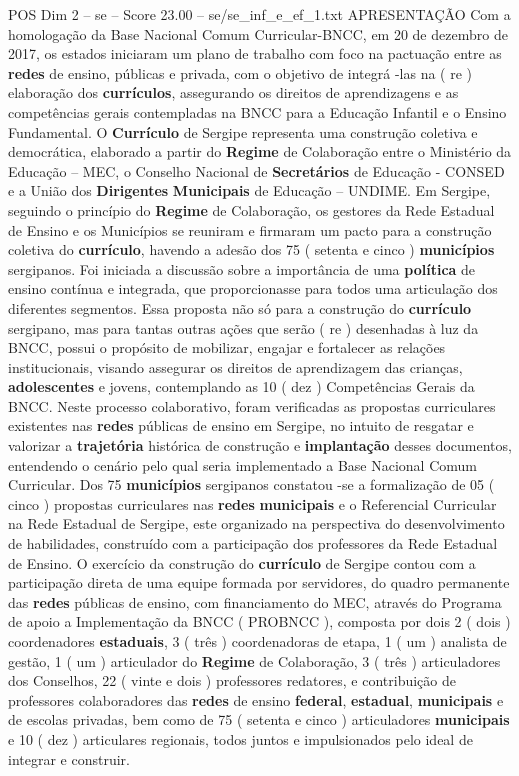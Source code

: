 \begin{textsample}{POS Dim 2 – se – Score 23.00 – se/se\_inf\_e\_ef\_1.txt}  \label{ex:f2_pos_027}
APRESENTAÇÃO Com a homologação da Base Nacional Comum Curricular-BNCC, em 20 de dezembro de 2017, os estados iniciaram um plano de trabalho com foco na pactuação entre as \textbf{redes} de ensino, públicas e privada, com o objetivo de integrá -las na ( re ) elaboração dos \textbf{currículos}, assegurando os direitos de aprendizagens e as competências gerais contempladas na BNCC para a Educação Infantil e o Ensino Fundamental.
O \textbf{Currículo} de Sergipe representa uma construção coletiva e democrática, elaborado a partir do \textbf{Regime} de Colaboração entre o Ministério da Educação – MEC, o Conselho Nacional de \textbf{Secretários} de Educação - CONSED e a União dos \textbf{Dirigentes} \textbf{Municipais} de Educação – UNDIME.
Em Sergipe, seguindo o princípio do \textbf{Regime} de Colaboração, os gestores da Rede Estadual de Ensino e os Municípios se reuniram e firmaram um pacto para a construção coletiva do \textbf{currículo}, havendo a adesão dos 75 ( setenta e cinco ) \textbf{municípios} sergipanos.
Foi iniciada a discussão sobre a importância de uma \textbf{política} de ensino contínua e integrada, que proporcionasse para todos uma articulação dos diferentes segmentos.
Essa proposta não só para a construção do \textbf{currículo} sergipano, mas para tantas outras ações que serão ( re ) desenhadas à luz da BNCC, possui o propósito de mobilizar, engajar e fortalecer as relações institucionais, visando assegurar os direitos de aprendizagem das crianças, \textbf{adolescentes} e jovens, contemplando as 10 ( dez ) Competências Gerais da BNCC.
Neste processo colaborativo, foram verificadas as propostas curriculares existentes nas \textbf{redes} públicas de ensino em Sergipe, no intuito de resgatar e valorizar a \textbf{trajetória} histórica de construção e \textbf{implantação} desses documentos, entendendo o cenário pelo qual seria implementado a Base Nacional Comum Curricular.
Dos 75 \textbf{municípios} sergipanos constatou -se a formalização de 05 ( cinco ) propostas curriculares nas \textbf{redes} \textbf{municipais} e o Referencial Curricular na Rede Estadual de Sergipe, este organizado na perspectiva do desenvolvimento de habilidades, construído com a participação dos professores da Rede Estadual de Ensino.
O exercício da construção do \textbf{currículo} de Sergipe contou com a participação direta de uma equipe formada por servidores, do quadro permanente das \textbf{redes} públicas de ensino, com financiamento do MEC, através do Programa de apoio a Implementação da BNCC ( PROBNCC ), composta por dois 2 ( dois ) coordenadores \textbf{estaduais}, 3 ( três ) coordenadoras de etapa, 1 ( um ) analista de gestão, 1 ( um ) articulador do \textbf{Regime} de Colaboração, 3 ( três ) articuladores dos Conselhos, 22 ( vinte e dois ) professores redatores, e contribuição de professores colaboradores das \textbf{redes} de ensino \textbf{federal}, \textbf{estadual}, \textbf{municipais} e de escolas privadas, bem como de 75 ( setenta e cinco ) articuladores \textbf{municipais} e 10 ( dez ) articulares regionais, todos juntos e impulsionados pelo ideal de integrar e construir.

\end{textsample}
